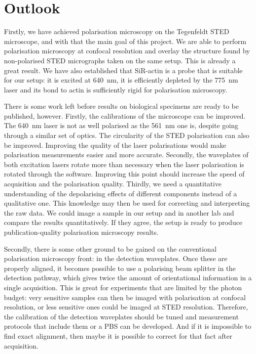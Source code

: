 
\chapter{Outlook}

Firstly, we have achieved polarisation microscopy on the Tegenfeldt STED microscope, and with that the main goal of this project. We are able to perform polarisation microscopy at confocal resolution and overlay the structure found by non-polarised STED micrographs taken on the same setup. This is already a great result. We have also established that SiR-actin is a probe that is suitable for our setup: it is excited at 640~nm, it is efficiently depleted by the 775~nm laser and its bond to actin is sufficiently rigid for polarisation microscopy.

There is some work left before results on biological specimens are ready to be published, however. Firstly, the calibrations of the microscope can be improved. The 640~nm laser is not as well polarised as the 561~nm one is, despite going through a similar set of optics. The circularity of the STED polarisation can also be improved. Improving the quality of the laser polarisations would make polarisation measurements easier and more accurate. Secondly, the waveplates of both excitation lasers rotate more than necessary when the laser polarisation is rotated through the software. Improving this point should increase the speed of acquisition and the polarisation quality. Thirdly, we need a quantitative understanding of the depolarising effects of different components instead of a qualitative one. This knowledge may then be used for correcting and interpreting the raw data. We could image a sample in our setup and in another lab and compare the results quantitatively. If they agree, the setup is ready to produce publication-quality polarisation microscopy results.

Secondly, there is some other ground to be gained on the conventional polarisation microscopy front: in the detection waveplates. Once these are properly aligned, it becomes possible to use a polarising beam splitter in the detection pathway, which gives twice the amount of orientational information in a single acquisition. This is great for experiments that are limited by the photon budget: very sensitive samples can then be imaged with polarisation at confocal resolution, or less sensitive ones could be imaged at STED resolution. Therefore, the calibration of the detection waveplates should be tuned and measurement protocols that include them or a PBS can be developed. And if it is impossible to find exact alignment, then maybe it is possible to correct for that fact after acquisition.

